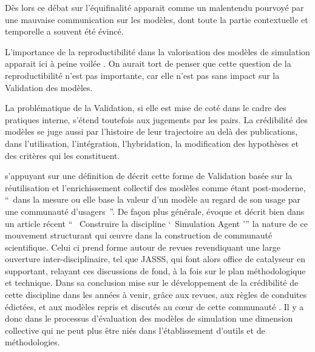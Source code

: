 
Dès lors ce débat sur l'équifinalité apparait comme un malentendu pourvoyé par une mauvaise communication sur les modèles, dont toute la partie contextuelle et temporelle a souvent été évincé.

L'importance de la reproductibilité dans la valorisation des modèles de simulation  apparait ici à peine voilée \autocites{Amblard2006, Wilensky2007a, Rouchier2013, Thiele2015}. On aurait tort de penser que cette question de la reproductibilité n'est pas importante, car elle n'est pas sans impact sur la Validation des modèles. 

La problématique de la Validation, si elle est mise de coté dans le cadre des pratiques interne, s'étend toutefois aux jugements par les pairs. La crédibilité des modèles se juge aussi par l'histoire de leur trajectoire au delà des publications, dans l'utilisation, l'intégration, l'hybridation, la modification des hypothèses et des critères qui les constituent.

\textcites{Rouchier2013} s'appuyant sur une définition de \textcite{Ahrweiler2005} décrit cette forme de Validation basée sur la réutilisation et l'enrichissement collectif des modèles comme étant post-moderne, \enquote{ dans la mesure ou elle base la valeur d'un modèle au regard de son usage par une communauté d'usagers }. De façon plus générale, \autocite{Rouchier2013} évoque et décrit bien dans un article récent \enquote{  Construire la discipline \enquote{ Simulation Agent }} la nature de ce mouvement structurant qui œuvre dans la construction de communauté scientifique. Celui ci prend forme autour de revues revendiquant une large ouverture inter-disciplinaire, tel que JASSS, qui font alors office de catalyseur en supportant, relayant ces discussions de fond, à la fois sur le plan méthodologique et technique. Dans sa conclusion \autocite{Rouchier2013} mise sur le développement de la crédibilité de cette discipline dans les années à venir, grâce aux revues, aux règles de conduites édictées, et aux modèles repris et discutés au cœur de cette communauté \autocite{Hales2003}. Il y a donc dans le processus d'évaluation des modèles de simulation une dimension collective qui ne peut plus être niés dans l'établissement d'outils et de méthodologies.

